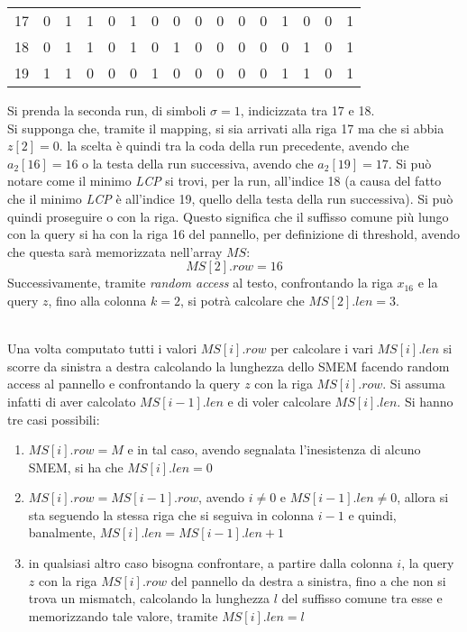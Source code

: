 \begin{esempio}
\begin{table}[H]
\begin{tabular}{c|cc|c|cccccccccccc}
      17 & 0 & 1 & 1 & 0 & 1 & 0 & 0 & 0 & 0 & 0 & 0 & 1 & 0 & 0 & 1 \\
      18 & 0 & 1 & 1 & 0 & 1 & 0 & 1 & 0 & 0 & 0 & 0 & 0 & 1 & 0 & 1 \\
      19 & 1 & 1 & 0 & 0 & 0 & 1 & 0 & 0 & 0 & 0 & 0 & 1 & 1 & 0 & 1 \\
    \end{tabular}
  \end{table}
  Si prenda la seconda run, di simboli $\sigma=1$, indicizzata tra 17 e 18. \\
  Si supponga che, tramite il mapping, si sia arrivati alla riga 17 ma che si
  abbia $z[2]=0$. la scelta è quindi tra la coda della run precedente, avendo
  che $a_2[16]=16$ o la testa della run successiva, avendo che $a_2[19]=17$. Si
  può notare come il minimo \textit{LCP} si trovi, per la 
  run, all'indice 18 (a causa del fatto che il minimo \textit{LCP} è all'indice
  19, quello della testa della run successiva). Si può quindi proseguire o con
  la riga. Questo significa che il suffisso comune più lungo con la query si ha
  con la riga 16 del pannello, per definizione di threshold, avendo che questa
  sarà memorizzata nell'array $MS$:
  \[MS[2].row=16\]
  Successivamente, tramite \textit{random access} al testo, confrontando la riga
  $x_{16}$ e la query $z$, fino alla colonna $k=2$, si potrà calcolare che
  $MS[2].len=3$. 
\end{esempio}
\\
Una volta computato tutti i valori $MS[i].row$ per calcolare i vari $MS[i].len$
si scorre da sinistra a destra calcolando la lunghezza dello SMEM facendo random
access al pannello e confrontando la query $z$ con la riga $MS[i].row$. Si
assuma infatti di aver calcolato $MS[i-1].len$ e di voler calcolare $MS[i].len$.
Si hanno tre casi possibili:
\begin{enumerate}
  \item $MS[i].row=M$ e in tal caso, avendo segnalata l'inesistenza di alcuno
  SMEM, si ha che $MS[i].len=0$
  \item $MS[i].row=MS[i-1].row$, avendo $i\neq 0$ e $MS[i-1].len\neq 0$, allora
  si sta seguendo la stessa riga che si seguiva in colonna $i-1$ e quindi,
  banalmente, $MS[i].len=MS[i-1].len+1$
  \item in qualsiasi altro caso bisogna confrontare, a partire dalla colonna
  $i$, la query 
  $z$ con la riga $MS[i].row$ del pannello da destra a sinistra, fino a che non
  si trova un mismatch, calcolando la lunghezza $l$ del suffisso comune tra esse
  e memorizzando tale valore, tramite $MS[i].len=l$
\end{enumerate}
